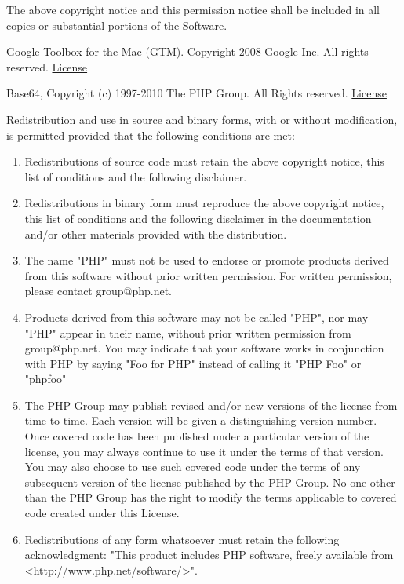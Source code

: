 \documentclass{tufte-book}
\newcommand{\licensetext}{\scriptsize \setlength{\parskip}{0mm} \singlespacing}
\begin{document}
\begin{fullwidth}
{The above copyright notice and this permission notice shall be included in
all copies or substantial portions of the Software.}

Google Toolbox for the Mac (GTM). Copyright 2008 Google Inc. All rights reserved. \href{http://www.apache.org/licenses/LICENSE-2.0}{License}

Base64, Copyright (c) 1997-2010 The PHP Group. All Rights reserved. \href{http://www.php.net/license/3_01.txt}{License}

{\licensetext Redistribution and use in source and binary forms, with or without
modification, is permitted provided that the following conditions
are met:
\begin{enumerate}
\item Redistributions of source code must retain the above copyright
notice, this list of conditions and the following disclaimer.

\item Redistributions in binary form must reproduce the above copyright
notice, this list of conditions and the following disclaimer in
the documentation and/or other materials provided with the
distribution.

\item The name "PHP" must not be used to endorse or promote products
derived from this software without prior written permission. For
written permission, please contact group@php.net.

\item Products derived from this software may not be called "PHP", nor
may "PHP" appear in their name, without prior written permission
from group@php.net.  You may indicate that your software works in
conjunction with PHP by saying "Foo for PHP" instead of calling
it "PHP Foo" or "phpfoo"

\item The PHP Group may publish revised and/or new versions of the
license from time to time. Each version will be given a
distinguishing version number.
Once covered code has been published under a particular version
of the license, you may always continue to use it under the terms
of that version. You may also choose to use such covered code
under the terms of any subsequent version of the license
published by the PHP Group. No one other than the PHP Group has
the right to modify the terms applicable to covered code created
under this License.

\item Redistributions of any form whatsoever must retain the following
acknowledgment:
"This product includes PHP software, freely available from
<http://www.php.net/software/>".
\end{enumerate}

}
\end{fullwidth}
\end{document}
